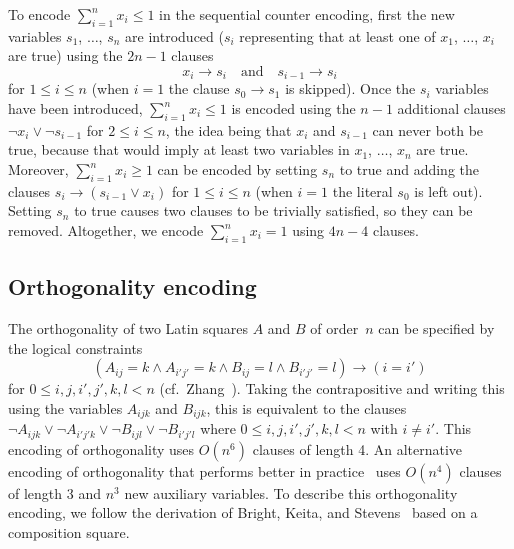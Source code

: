 \documentclass[runningheads]{llncs}
\newcommand{\limp}{\mathbin\rightarrow}
\begin{document}
To encode $\sum_{i=1}^n x_i\leq 1$ in the sequential counter encoding, first
the new variables $s_1$, $\dotsc$, $s_n$ are introduced ($s_i$ representing
that at least one of $x_1$, $\dotsc$, $x_i$ are true) using the $2n-1$ clauses
\begin{equation} x_i\limp s_i \quad\text{and}\quad s_{i-1}\limp s_i \end{equation}
for $1\leq i\leq n$ (when $i=1$ the clause $s_0\limp s_1$ is skipped).
Once the $s_i$ variables have been introduced, $\sum_{i=1}^n x_i\leq 1$ is encoded
using the $n-1$ additional clauses $\lnot x_i\lor\lnot s_{i-1}$ for $2\leq i\leq n$,
the idea being that $x_i$ and $s_{i-1}$ can never both be true, because that would imply
at least two variables in $x_1$, $\dotsc$, $x_n$ are true.
Moreover, $\sum_{i=1}^n x_i\geq 1$ can be encoded by setting $s_n$ to true and
adding the clauses $s_i\limp(s_{i-1}\lor x_i)$ for $1\leq i\leq n$ (when $i=1$
the literal $s_0$ is left out).
Setting $s_n$ to true causes two clauses to be trivially satisfied, so they can be removed.
Altogether, we encode $\sum_{i=1}^n x_i=1$ using $4n-4$ clauses.

\subsection{Orthogonality encoding}\label{sec:ortho-enc}

The orthogonality
of two Latin squares $A$ and $B$ of order~$n$ can be specified by the logical constraints
\begin{equation} (A_{ij}=k\land A_{i'j'}=k\land B_{ij}=l\land B_{i'j'}=l)\limp(i=i') \end{equation}
for $0\leq i,j,i',j',k,l<n$ (cf.~Zhang~\cite[Lemma~1]{zhang1997specifying}).
Taking the contrapositive and writing
this using the variables $A_{ijk}$ and $B_{ijk}$, this is equivalent
to the clauses
$\lnot A_{ijk}\lor\lnot A_{i'j'k}\lor\lnot B_{ijl}\lor\lnot B_{i'j'l}$
where $0\leq i,j,i',j',k,l<n$ with $i\neq i'$.  This encoding
of orthogonality uses $O(n^6)$ clauses of length 4.  An alternative
encoding of orthogonality that performs better in practice~\cite[Lemma 2]{zhang1997specifying}
uses $O(n^4)$ clauses of length 3 and $n^3$ new auxiliary variables.  To describe
this orthogonality encoding, we follow the derivation of Bright, Keita, and Stevens~\cite{myrvoldmols}
based on a composition square.
\end{document}
